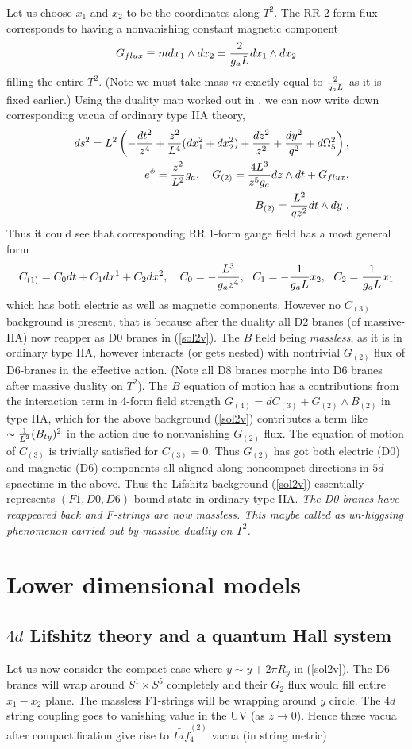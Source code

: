 \documentclass[12pt]{article}
\def\be{\begin{equation}} \def\ee{\end{equation}}
\def\bea{\begin{eqnarray}} \def\eea{\end{eqnarray}} \def\ba{\begin{array}}
\newcommand{\eqn}[1]{(\ref{#1})}
\def\br{\nonumber\\}
\begin{document}
Let us choose $x_1$ and $x_2$ to be  the coordinates along  $T^2$. 
The   RR 2-form flux corresponds to having a nonvanishing 
constant  magnetic component  
\be
G_{flux}\equiv
{m }dx_1\wedge dx_2
={2 \over g_aL}dx_1\wedge dx_2
\ee
filling the entire $T^2$. 
(Note we must take mass  $m$ exactly equal to 
${2\over g_aL}$ as it is fixed earlier.) 
Using the duality map worked out in \cite{hs2001},   
we can now write down corresponding  vacua 
of ordinary type IIA theory,
\bea\label{sol2v}
&&ds^2=L^2\left( - {dt^2\over  z^4} +{z^2\over L^4 }(dx_1^2+dx_2^2)+{dz^2\over
z^2}  +{dy^2\over q^2} + d\Omega_5^2 \right) ,\br
&&e^\phi= {z^2\over L^2} g_a, ~~~
G_{(2)}= {4L^3\over z^5 g_a} dz\wedge dt + G_{flux}
,  \br 
&& B_{(2)}=  {L^2\over q z^2} dt\wedge dy \ ,
\eea 
Thus it could see that corresponding RR 1-form
gauge field has a most general form
\be
C_{(1)}=C_0 dt+C_1dx^1+C_2dx^2,~~~C_0=-{L^3\over g_a z^4},~~C_1= -
{1\over g_aL} x_2,~~C_2={1\over g_aL}  x_1
\ee 
which has both electric as well as magnetic components.
However no $C_{(3)}$ background is present, that
 is because after the duality all D2 branes (of massive-IIA) now 
reapper as  D0 branes in \eqn{sol2v}.
The   $B$ field   being  {\it massless}, as it is  in ordinary type IIA, 
 however  interacts (or gets nested) 
with nontrivial $G_{(2)}$ flux of D6-branes in the effective action. 
(Note all D8 branes  morphe into D6 branes after massive duality on $T^2$). 
The $B$ equation of motion  has a contributions from the
 interaction term in 4-form field strength
$G_{(4)}=dC_{(3)}+G_{(2)}\wedge B_{(2)}$ 
in type  IIA,
which for the above background \eqn{sol2v} contributes 
 a term like  $\sim  {1\over L^2} (B_{ty})^2$  in the action
due to nonvanishing $G_{(2)}$ flux. 
The equation of motion of   $C_{(3)}$ is trivially satisfied for $C_{(3)}=0$.
Thus $G_{(2)}$  has got both electric (D0) and magnetic (D6) components
all aligned along  noncompact directions in $5d$ spacetime in the above.
Thus the   Lifshitz background \eqn{sol2v} essentially
represents   $(F1, D0, D6)$ bound state in ordinary type IIA. 
{\it The D0 branes have reappeared back and F-strings are now massless.
This maybe called as un-higgsing phenomenon carried out by massive duality
on $T^2$. }

\section{Lower dimensional models}
\subsection{$4d$ Lifshitz theory and a quantum Hall system}
Let us now  consider the compact case where
$y\sim y +2\pi R_y$  in \eqn{sol2v}.  
The D6-branes will wrap around $S^1\times S^5$ completely 
and their  $G_2$ flux would
fill entire  $x_1-x_2$  plane. The massless F1-strings will be wrapping 
around  $y$ circle. The $4d$
 string coupling  goes to vanishing value in the UV (as $z\to 0$). 
Hence these vacua after compactification 
 give rise to  
$\widetilde{Lif}_4^{(2)}$ vacua (in string metric)
\end{document}
